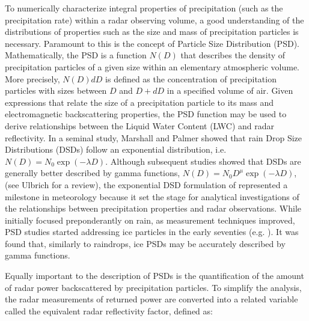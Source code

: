 \documentclass[10pt]{ietbook}
\begin{document}
To numerically characterize integral properties of precipitation (such as the precipitation rate) within a radar observing volume, a good understanding of the 
distributions of properties such as the size and mass of precipitation particles is necessary.
Paramount to this is the concept of Particle Size Distribution (PSD).  Mathematically, the PSD is a function $N(D)$ that describes the density of precipitation particles of
a given size within an elementary atmospheric volume.  More precisely, $N(D)dD$ is defined as the concentration of precipitation particles with sizes between $D$ and $D+dD$
in a specified volume of air.  Given expressions that relate the size of a precipitation particle to its mass and electromagnetic backscattering
properties, the PSD function may be used to derive relationships between the Liquid Water Content (LWC) and radar reflectivity.  In a seminal
study, Marshall and Palmer  \cite{marshall_palmer_1948} showed that rain Drop Size Distributions (DSDs) follow an exponential distribution,
i.e. $N(D)=N_0\exp(-\lambda D)$.  Although subsequent studies showed that DSDs are generally better described by gamma functions,
$N(D)=N_0 D^{\mu}\exp(-\lambda D)$, (see Ulbrich 
\cite{ulbrich1983} for a review), the exponential DSD formulation of \cite{marshall_palmer_1948} represented a milestone in meteorology because
it set the stage for analytical investigations of the relationships between precipitation properties and radar observations.  While initially
focused preponderantly on rain, as measurement techniques improved, PSD studies started addressing ice particles in the early seventies 
(e.g. \cite{ssrivastava1970,heymsfield_a1977}). It was found that, similarly to raindrops, ice PSDs may be accurately described by gamma functions.

Equally important to the description of PSDs is the quantification of the amount of radar power backscattered by precipitation particles. 
To simplify the analysis, the radar measurements of returned power are converted into a related variable called the equivalent 
radar reflectivity factor, defined as:
\end{document}
